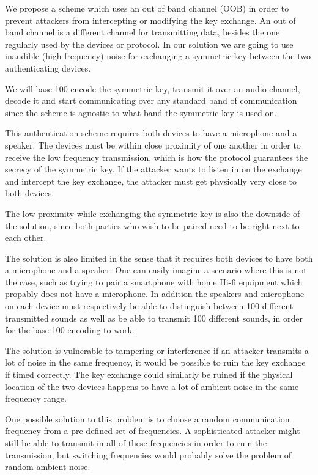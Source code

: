 \documentclass[12pt]{article}
\begin{document}
We propose a scheme which uses an out of band channel (OOB) in order to prevent attackers from intercepting or modifying the key exchange. An out of band channel is a different channel for transmitting data, besides the one regularly used by the devices or protocol. In our solution we are going to use inaudible (high frequency) noise for exchanging a symmetric key between the two authenticating devices.

We will base-100 encode the symmetric key, transmit it over an audio channel, decode it and start communicating over any standard band of communication since the scheme is agnostic to what band the symmetric key is used on.

This authentication scheme requires both devices to have a microphone and a speaker.
The devices must be within close proximity of one another in order to receive the low frequency transmission, which is how the protocol guarantees the secrecy of the symmetric key. If the attacker wants to listen in on the exchange and intercept the key exchange, the attacker must get physically very close to both devices.

The low proximity while exchanging the symmetric key is also the downside of the solution, since both parties who wish to be paired need to be right next to each other.

The solution is also limited in the sense that it requires both devices to have both a microphone and a speaker. One can easily imagine a scenario where this is not the case, such as trying to pair a smartphone with home Hi-fi equipment which propably does not have a microphone. In addition the speakers and microphone on each device must respectively be able to distinguish between 100 different transmitted sounds as well as be able to transmit 100 different sounds, in order for the base-100 encoding to work.

The solution is vulnerable to tampering or interference if an attacker transmits a lot of noise in the same frequency, it would be possible to ruin the key exchange if timed correctly. The key exchange could similarly be ruined if the physical location of the two devices happens to have a lot of ambient noise in the same frequency range.

One possible solution to this problem is to choose a random communication frequency from a pre-defined set of frequencies. A sophisticated attacker might still be able to transmit in all of these frequencies in order to ruin the transmission, but switching frequencies would probably solve the problem of random ambient noise.
\end{document}
